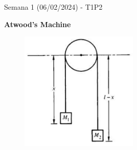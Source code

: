 \begin{frame}{Semana 1 (06/02/2024) - T1P2}

    \textbf{Atwood's Machine}

    \begin{figure}[H]
    \centering
    \includegraphics[width=0.5\textwidth]{figures/t1t2.png}
\end{figure}
    
\end{frame}

